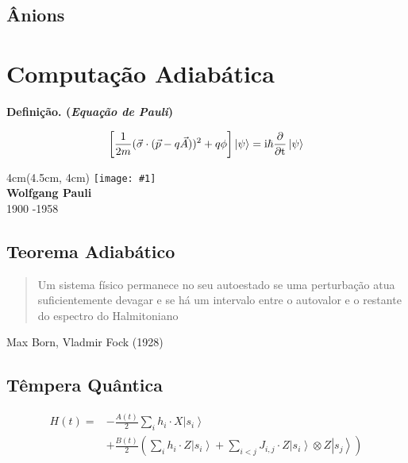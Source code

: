 \documentclass[t]{beamer}
\newcommand{\ii}{
	\rm{i}
}
\newcommand{\definicao}[1]{%
	\textbf{Definição. (\emph{#1})\\}
}
\newcommand{\ket}[1]{\ensuremath{\left|#1\right\rangle}}
\newcommand{\frasepor}[2]{
	\begin{center}
		\begin{quote}
			#1
		\end{quote}
		\hfill {\small #2}
	\end{center}
}
\newcommand{\person}[6]{%
\begin{textblock*}{#4}(#5, #6)
	\texttt{[image: \#1]}\\
	\textbf{#2}\\
	{\small #3}
\end{textblock*}
}
\begin{document}
	\begin{frame}{\subsecname}
	
	\end{frame}	
	
	\begin{frame}{\subsecname}
	
	\end{frame}
	
	\subsection{Ânions}
	
	\begin{frame}{\subsecname}
	
	\end{frame}	
	
	\begin{frame}{\subsecname}
	
	\end{frame}
	
	\section{Computação Adiabática}
	
	\begin{frame}{\secname}
	\definicao{Equação de Pauli}
	$$\left[{\frac {1}{2m}}({\vec {\sigma }}\cdot ({\vec {p}}-q{\vec {A}}))^{2}+q\phi \right]\ket{\psi} = \ii\hbar {\frac {\partial }{\partial t}}\ket{\psi}$$
	
	\person{pauli.jpg}{Wolfgang Pauli}{1900 -1958}{4cm}{4.5cm}{4cm}	
	
	\end{frame}
	
	\subsection{Teorema Adiabático}
	
	\frasepor{Um sistema físico permanece no seu autoestado se uma perturbação atua suficientemente devagar e se há um intervalo entre o autovalor e o restante do espectro do Halmitoniano}{Max Born, Vladmir Fock (1928)}
	
	\subsection{Têmpera Quântica}	
	
	\begin{frame}{\subsecname}
		\begin{align*}
			H(t) = &-\frac{A(t)}{2}  \sum_{i} h_i \cdot X\ket{s_i}\\ &+ \frac{B(t)}{2}\left(\sum_{i} h_i \cdot Z\ket{s_i} + \sum_{i < j} J_{i,j} \cdot Z\ket{s_i} \otimes Z\ket{s_j}\right)
		\end{align*}
	\end{frame}
	
\end{document}
